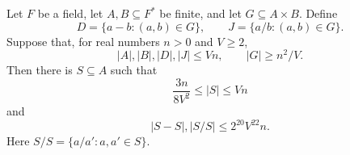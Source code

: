 \begin{lemma}
\label{inc-simultaneous-extraction}
Let $F$ be a field, let $A,B\subseteq F^*$ be finite, and let
$G\subseteq A\times B$. Define
\[
 D=\{a-b:(a,b)\in G\},\qquad
 J=\{a/b:(a,b)\in G\}.
\]
Suppose that, for real numbers $n>0$ and $V\ge2$,
\begin{equation}\label{eq:inc-graph-hypotheses}
 |A|,|B|,|D|,|J|\le Vn,
 \qquad |G|\ge n^2/V.
\end{equation}
Then there is $S\subseteq A$ such that
\begin{equation}\label{eq:inc-extracted-size}
 \frac{3n}{8V^2}\le |S|\le Vn
\end{equation}
and
\begin{equation}\label{eq:inc-extracted-expansion}
 |S-S|,|S/S|\le 2^{20}V^{22}n.
\end{equation}
Here $S/S=\{a/a':a,a'\in S\}$.
\end{lemma}

